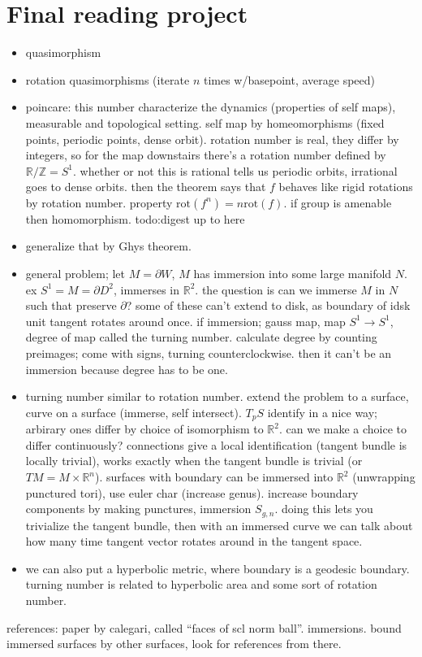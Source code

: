 \documentclass{article}
\newcommand\R{\ensuremath{\mathbb{R}}}
\newcommand\Z{\ensuremath{\mathbb{Z}}}
\begin{document}
\section{Final reading project} 
\begin{itemize}
\setlength\itemsep{-.2em}
    \item quasimorphism
    \item rotation quasimorphisms (iterate $n$ times w/basepoint, average speed)
    \item poincare: this number characterize the dynamics (properties of self maps), measurable and topological setting. self map by homeomorphisms (fixed points, periodic points, dense orbit). rotation number is real, they differ by integers, so for the map downstairs there's a rotation number defined by $\R/\Z=S^1 $. whether or not this is rational tells us periodic orbits, irrational goes to dense orbits. then the theorem says that $f$ behaves like rigid rotations by rotation number. property $\mathrm{rot}(f^n )= n \mathrm{rot}(f)$. if group is amenable then homomorphism. todo:digest up to here 
    \item generalize that by Ghys theorem.
    \item general problem; let $M = \partial W$, $M$ has immersion into some large manifold  $N$. ex $S^1 =M= \partial D^2$, immerses in $\R^2$. the question is can we immerse $M$ in $N$ such that preserve $\partial $? some of these can't extend to disk, as boundary of idsk unit tangent rotates around once. if immersion; gauss map, map $S^1  \to S^1 $, degree of map called the turning number. calculate degree by counting preimages; come with signs, turning counterclockwise. then it can't be an immersion because degree has to be one.
    \item turning number similar to rotation number. extend the problem to a surface, curve on a surface (immerse, self intersect). $T_p S$ identify in a nice way; arbirary ones differ by choice of isomorphism to $\R^2$. can we make a choice to differ continuously? connections give a local identification (tangent bundle is locally trivial), works exactly when the tangent bundle is trivial (or $TM= M \times \R^n $). surfaces with boundary can be immersed into $\R^2$ (unwrapping punctured tori), use euler char (increase genus). increase boundary components by making punctures, immersion $S _{g,n}$. doing this lets you trivialize the tangent bundle, then with an immersed curve we can talk about how many time tangent vector rotates around in the tangent space.
    \item we can also put a hyperbolic metric, where boundary is a geodesic boundary. turning number is related to hyperbolic area and some sort of rotation number.
\end{itemize}
references: paper by calegari, called ``faces of scl norm ball''. immersions. bound immersed surfaces by other surfaces, look for references from there.
\end{document}
